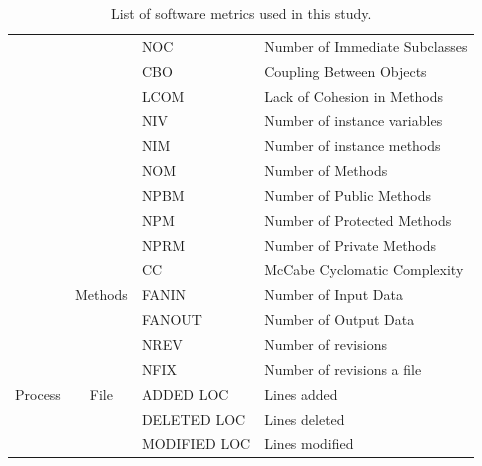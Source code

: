 \documentclass[10pt,journal,compsoc]{IEEEtran}
\begin{document}
\begin{table}[!t]
\begin{tabular}{|p{1cm}|c|l|p{3cm}|}
                                  &                                   & NOC         & Number of Immediate Subclasses \\ \cline{3-4} 
                                  &                                   & CBO         & Coupling Between Objects       \\ \cline{3-4} 
                                  &                                   & LCOM        & Lack of Cohesion in Methods    \\ \cline{3-4} 
                                  &                                   & NIV         & Number of instance variables   \\ \cline{3-4} 
                                  &                                   & NIM         & Number of instance methods     \\ \cline{3-4} 
                                  &                                   & NOM         & Number of Methods              \\ \cline{3-4} 
                                  &                                   & NPBM        & Number of Public Methods       \\ \cline{3-4} 
                                  &                                   & NPM         & Number of Protected Methods    \\ \cline{3-4} 
                                  &                                   & NPRM        & Number of Private Methods      \\ \cline{2-4} 
                                  & \multirow{3}{*}{Methods}          & CC          & McCabe Cyclomatic Complexity   \\ \cline{3-4} 
                                  &                                   & FANIN       & Number of Input Data           \\ \cline{3-4} 
                                  &                                   & FANOUT      & Number of Output Data          \\ \hline
\multirow{5}{*}{Process }  & \multirow{5}{*}{File}             & NREV        & Number of revisions            \\ \cline{3-4} 
                                  &                                   & NFIX        & Number of revisions a file     \\ \cline{3-4} 
                                  &                                   & ADDED LOC    & Lines added                    \\ \cline{3-4} 
                                  &                                   & DELETED LOC  & Lines deleted                  \\ \cline{3-4} 
                                  &                                   & MODIFIED LOC & Lines modified                 \\ \hline
\end{tabular}
\caption{List of software metrics used in this study.}
\label{tbl:metric}
\end{table}
\end{document}
